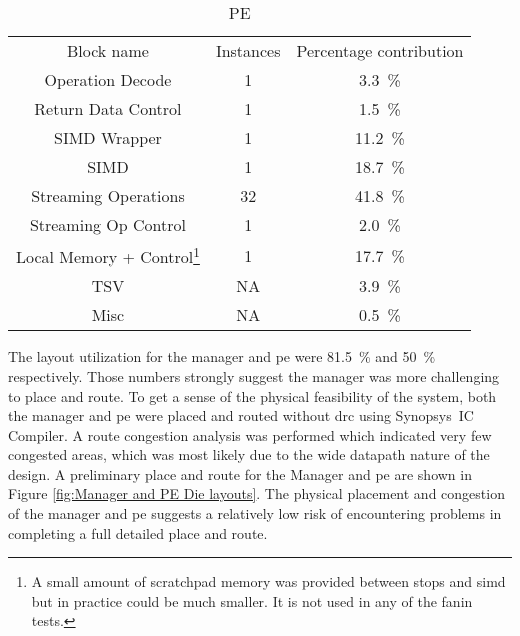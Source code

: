 \begin{table}[h]
\begin{subtable}{1\textwidth}
    \centering
    \begin{adjustbox}{width=0.55\textwidth}
      \begin{tabular}{|c|c|c|}
        \hline
       \multirow{2}{*}{Block name}    &  \multirow{2}{*}{Instances}        &  \multirow{2}{*}{Percentage contribution}     \\  %
                                      &                                    &                                               \\
        \hline  %
     Operation Decode    & 1&\SI[per-mode=symbol]{ 3.3}{\percent}  \\
   Return Data Control   & 1&\SI[per-mode=symbol]{ 1.5}{\percent}  \\
    SIMD Wrapper         & 1&\SI[per-mode=symbol]{11.2}{\percent}  \\
        SIMD             & 1&\SI[per-mode=symbol]{18.7}{\percent}  \\
  Streaming Operations   &32&\SI[per-mode=symbol]{41.8}{\percent}  \\
  Streaming Op Control   & 1&\SI[per-mode=symbol]{ 2.0}{\percent}  \\
 Local Memory + Control\footnote{A small amount of scratchpad memory was provided between \acp{stop} and \ac{simd} but in practice could be much smaller. It is not used in any of the fanin tests.}  & 1&\SI[per-mode=symbol]{17.7}{\percent}  \\ 
        TSV              &NA&\SI[per-mode=symbol]{ 3.9}{\percent}  \\
        Misc             &NA&\SI[per-mode=symbol]{ 0.5}{\percent}  \\
        \hline
      \end{tabular}
    \end{adjustbox}
    \vspace{3pt}
    \captionsetup{justification=centering, skip=10pt}
    \caption{PE}
    \label{tab:PE Area Contribution}
  \end{subtable}
  \end{table}

The layout utilization for the manager and \ac{pe} were \SI{81.5}{\percent} and \SI{50}{\percent} respectively.
Those numbers strongly suggest the manager was more challenging to place and route.
To get a sense of the physical feasibility of the system, both the manager and \ac{pe} were placed and routed without \ac{drc} using Synopsys\textregistered ~IC Compiler\texttrademark.
A route congestion analysis was performed which indicated very few congested areas, which was most likely due to the wide datapath nature of the design.
A preliminary place and route for the Manager and \ac{pe} are shown in Figure \ref{fig:Manager and PE Die layouts}. 
The physical placement and congestion of the manager and \ac{pe} suggests a relatively low risk of encountering problems in completing a full detailed place and route.

